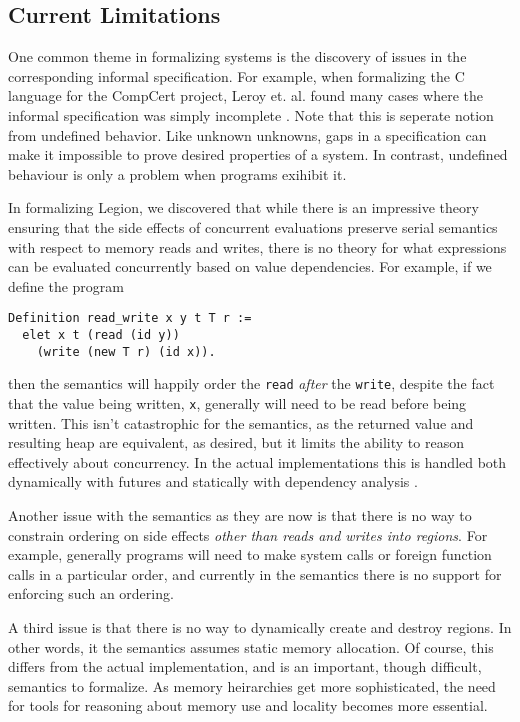 \documentclass[sigconf]{acmart}
\begin{document}
\subsection{Current Limitations}

One common theme in formalizing systems is the discovery of issues in the
corresponding informal specification. For example, when formalizing the C
language for the CompCert project, Leroy et. al. found many cases where the
informal specification was simply incomplete \cite{compcert}. Note that this is
seperate notion from undefined behavior. Like unknown unknowns, gaps in a
specification can make it impossible to prove desired properties of a system.
In contrast, undefined behaviour is only a problem when programs exihibit it.

In formalizing Legion, we discovered that while there is an impressive theory
ensuring that the side effects of concurrent evaluations preserve serial
semantics with respect to memory reads and writes, there is no theory for what
expressions can be evaluated concurrently based on value dependencies. For
example, if we define the program
\begin{center}
\begin{BVerbatim}
Definition read_write x y t T r :=
  elet x t (read (id y)) 
    (write (new T r) (id x)).
\end{BVerbatim}
\end{center}
then the semantics will happily order the \texttt{read} \emph{after} the
\texttt{write}, despite the fact that the value being written, \texttt{x},
generally will need to be read before being written. This isn't catastrophic
for the semantics, as the returned value and resulting heap are equivalent, 
as desired, but it limits the ability to reason effectively about concurrency. 
In the actual implementations this is handled both dynamically with futures
and statically with dependency analysis \cite{regent}.

Another issue with the semantics as they are now is that there is no way to 
constrain ordering on side effects \emph{other than reads and writes into
regions}. For example, generally programs will need to make system calls or
foreign function calls in a particular order, and currently in the semantics
there is no support for enforcing such an ordering.

A third issue is that there is no way to dynamically create and destroy
regions. In other words, it the semantics assumes static memory allocation.
Of course, this differs from the actual implementation, and is an important,
though difficult, semantics to formalize. As memory heirarchies get more 
sophisticated, the need for tools for reasoning about memory use and locality
becomes more essential. 
\end{document}
